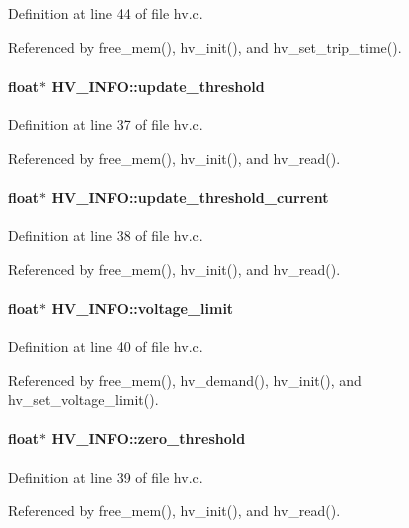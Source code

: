 Definition at line 44 of file hv.c.

Referenced by free\_\-mem(), hv\_\-init(), and hv\_\-set\_\-trip\_\-time().
\paragraph[{update\_\-threshold}]{\setlength{\rightskip}{0pt plus 5cm}float$\ast$ {\bf HV\_\-INFO::update\_\-threshold}}\hfill\label{structHV__INFO_a95fca973c2f8312e960cd4bb52963058}


Definition at line 37 of file hv.c.

Referenced by free\_\-mem(), hv\_\-init(), and hv\_\-read().
\paragraph[{update\_\-threshold\_\-current}]{\setlength{\rightskip}{0pt plus 5cm}float$\ast$ {\bf HV\_\-INFO::update\_\-threshold\_\-current}}\hfill\label{structHV__INFO_a3cec5d42540d9e8264b083e85c4a3bf2}


Definition at line 38 of file hv.c.

Referenced by free\_\-mem(), hv\_\-init(), and hv\_\-read().
\paragraph[{voltage\_\-limit}]{\setlength{\rightskip}{0pt plus 5cm}float$\ast$ {\bf HV\_\-INFO::voltage\_\-limit}}\hfill\label{structHV__INFO_a98357ca25873d9cf7f0df5fd94cf4df2}


Definition at line 40 of file hv.c.

Referenced by free\_\-mem(), hv\_\-demand(), hv\_\-init(), and hv\_\-set\_\-voltage\_\-limit().
\paragraph[{zero\_\-threshold}]{\setlength{\rightskip}{0pt plus 5cm}float$\ast$ {\bf HV\_\-INFO::zero\_\-threshold}}\hfill\label{structHV__INFO_a4696558233da1263e01e8971a01923e0}


Definition at line 39 of file hv.c.

Referenced by free\_\-mem(), hv\_\-init(), and hv\_\-read().